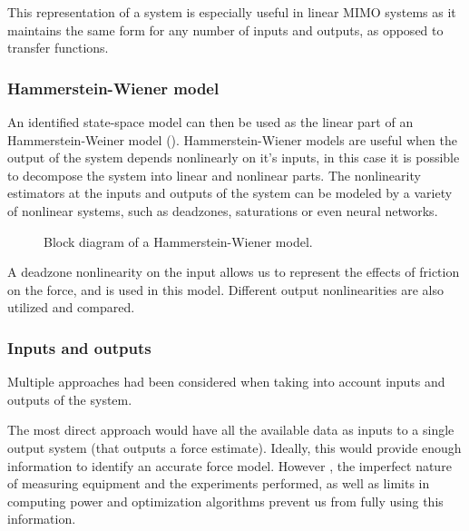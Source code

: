 This representation of a system is especially useful in linear MIMO systems as it maintains the same form for any number of inputs and outputs, as opposed to transfer functions.

\subsubsection{Hammerstein-Wiener model}
An identified state-space model can then be used as the linear part of an Hammerstein-Weiner model ().
Hammerstein-Wiener models are useful when the output of the system depends nonlinearly on it's inputs, in this case it is possible to decompose the system into linear and nonlinear parts. 
The nonlinearity estimators at the inputs and outputs of the system can be modeled by a variety of nonlinear systems, such as deadzones, saturations or even neural networks.

\begin{figure} 
\caption{Block diagram of a Hammerstein-Wiener model.}
\label{weiner}
\end{figure}

A deadzone nonlinearity on the input allows us to represent the effects of friction on the force, and is used in this model.
Different output nonlinearities are also utilized and compared.

\subsubsection{Inputs and outputs}
Multiple approaches had been considered when taking into account inputs and outputs of the system.

The most direct approach would have all the available data as inputs to a single output system (that outputs a force estimate).
Ideally, this would provide enough information to identify an accurate force model.
However , the imperfect nature of measuring equipment and the experiments performed, as well as limits in computing power and optimization algorithms prevent us from fully using this information.

